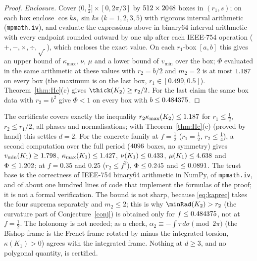 \begin{proof}
\emph{Enclosure.} Cover $(0,\frac12]\times[0,2\pi/3]$ by $512\times2048$ boxes in $(r_1,s)$; on each box enclose $\cos ks,\sin ks$ ($k=1,2,3,5$) with rigorous interval arithmetic (\texttt{mpmath.iv}), and evaluate the expressions above in binary64 interval arithmetic with every endpoint rounded outward by one ulp after each IEEE-754 operation ($+,-,\times,\div,\sqrt{\ }$), which encloses the exact value. On each $r_1$-box $[a,b]$ this gives an upper bound of $\kappa_{\max}$, $\nu$, $\mu$ and a lower bound of $v_{\min}$ over the box; $\Phi$ evaluated in the same arithmetic at these values with $r_2=b/2$ and $m_2=2$ is at most $1.187$ on every box (the maximum is on the last box, $r_1\in[0.499,0.5]$). Theorem~\ref{thm:Hc}(c) gives $\thick(K_2)\ge r_2/2$. For the last claim the same box data with $r_2=b^2$ give $\Phi<1$ on every box with $b\le0.484375$.
\end{proof}

\begin{remark}\label{rem:d2method}
The certificate covers exactly the inequality $r_2\kappa_{\max}(K_2)\le1.187$ for $r_1\le\frac12$, $r_2\le r_1/2$, all phases and normalisations; with Theorem~\ref{thm:Hc}(c) (proved by hand) this settles $d=2$. For the concrete family at $f=\frac12$ ($r_1=\frac12$, $r_2\le\frac14$), a second computation over the full period ($4096$ boxes, no symmetry) gives $v_{\min}(K_1)\ge1.798$, $\kappa_{\max}(K_1)\le1.427$, $\nu(K_1)\le0.433$, $\mu(K_1)\le4.638$ and $\Phi\le1.202$; at $f=0.35$ and $0.25$ ($r_2\le f^2$), $\Phi\le0.245$ and $\le0.0891$. The trust base is the correctness of IEEE-754 binary64 arithmetic in NumPy, of \texttt{mpmath.iv}, and of about one hundred lines of code that implement the formulas of the proof; it is not a formal verification. The bound is not sharp, because \eqref{eq:kaprec} takes the four suprema separately and $m_2\le2$; this is why $\minRad(K_2)>r_2$ (the curvature part of Conjecture~\ref{conj}) is obtained only for $f\le0.484375$, not at $f=\frac12$. The holonomy is not needed; as a check, $\alpha_2\equiv-\int\tau\,d\sigma\pmod{2\pi}$ (the Bishop frame is the Frenet frame rotated by minus the integrated torsion, $\kappa(K_1)>0$) agrees with the integrated frame. Nothing at $d\ge3$, and no polygonal quantity, is certified.
\end{remark}

